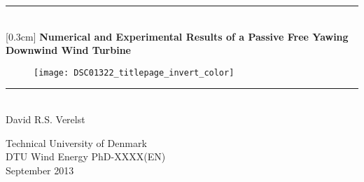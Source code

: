 \begin{titlingpage}

\centering \parindent=0pt
\newcommand{\HRule}{\rule{\textwidth}{1mm}}
\HRule\\
[0.3cm]
\Large\bfseries Numerical and Experimental Results of a Passive Free Yawing Downwind Wind Turbine \\
[0.3cm]
\begin{figure}[!h]
\centering
\graphicspath{{/home/dave/PhD/Projects/OJF/pictures/selection/}}
\texttt{[image: DSC01322\_titlepage\_invert\_color]}
\end{figure}
\HRule\\
[2cm]  
\large David R.S. Verelst\\
 \normalsize %
\begin{flushleft} 
Technical University of Denmark\\
DTU Wind Energy  PhD-XXXX(EN)\\
September 2013
\end{flushleft}

\end{titlingpage}
